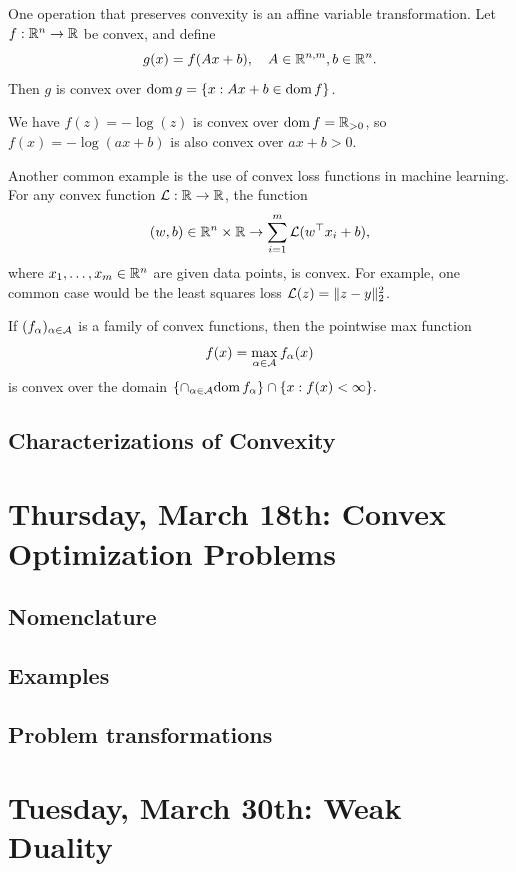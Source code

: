 \documentclass[11 pt]{scrartcl}
\begin{document}
One operation that preserves convexity is an affine variable transformation. 
Let $f:\mathbb R^n\to\mathbb R$ be convex, and define 
\[ g(x) = f(Ax+b), \quad A \in \mathbb R^{n,m}, b\in \mathbb R^n.\] 
Then $g$ is convex over $\text{dom}\, g = \{x : Ax + b \in \text{dom}\, f\}$. 
\begin{example}
    We have $f(z) =  -\log (z)$ is convex over $\text{dom}\, f = \mathbb R_{>0}$, so $f(x) = -\log(ax+b)$ is also convex over $ax+b>0$. 

    Another common example is the use of convex loss functions in machine learning. 
    For any convex function $\mathcal L :\mathbb R\to\mathbb R$, the function 
    \[ (w,b) \in \mathbb R^n \times \mathbb R \to \sum_{i=1}^m \mathcal L(w^\top x_i + b),\] 
    where $x_1, \dots, x_m\in\mathbb R^n$ are given data points, is convex. 
    For example, one common case would be the least squares loss $\mathcal L(z) = \|z-y\|_2^2$. 
\end{example}

If $(f_\alpha)_{\alpha\in\mathcal A}$ is a family of convex functions, then the pointwise max function 
\[ f(x) = \max_{\alpha\in\mathcal A} f_\alpha (x)\] 
is convex over the domain $\{\cap_{\alpha\in \mathcal A} \text{dom}\, f_\alpha\} \cap \{x : f(x) < \infty\}.$

\subsection{Characterizations of Convexity}


\newpage
\section{Thursday, March 18th: Convex Optimization Problems}
\subsection{Nomenclature}
\subsection{Examples}
\subsection{Problem transformations}

\newpage
\section{Tuesday, March 30th: Weak Duality}
\end{document}
